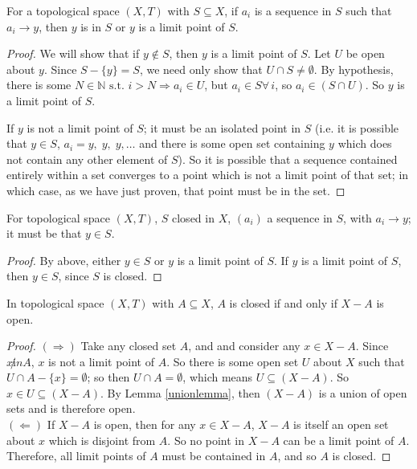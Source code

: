 \documentclass[12pt]{report}
\newcommand{\claim}{ \noindent{\sc Claim }\hspace{5pt} }
\newcommand{\corollary} {\noindent{\sc Corollary}\hspace{5pt} }
\newcommand{\fall}{\forall\,}
\newcommand{\st}{\textrm{ s.t. }}
\newcommand{\naturals}{\mathbb{N}}
\begin{document}
\claim For a topological space $(X,T)$ with $S \subseteq X$, if $a_i$
is a sequence in $S$ such that $a_i \rightarrow y$, then $y$ is in $S$
or $y$ is a limit point of $S$.

\begin{proof}
We will show that if $y \not \in S$, then $y$ is a limit point of $S$.
Let $U$ be open about $y$. Since $S - \{y\} = S$, we need only show that $U
\cap S \neq \emptyset$. By hypothesis, there is some $N \in \naturals \st 
i > N \Rightarrow a_i \in U$, but $a_i \in S \fall i$, so $a_i \in (S \cap
U)$. So $y$ is a limit point of $S$.

If $y$ is not a limit point of $S$; it must be an isolated point in $S$ (i.e.
it is possible that $y \in S$,  $a_i = y,\;y,\;y,\dots$ and there is some open
set containing $y$ which does not contain any other element of $S$). So it is
possible that a sequence contained entirely within a set converges to a point
which is not a limit point of that set; in which case, as we have just proven,
that point must be in the set.
\end{proof}

\corollary For topological space $(X,T)$, $S$ closed in $X$, $(a_i)$ a
sequence in $S$, with $a_i \rightarrow y$; it must be that $y \in S$. 

\begin{proof}
By above, either $y \in S$ or $y$ is a limit point of $S$. If $y$ is a
limit point of $S$, then $y \in S$, since $S$ is closed. 
\end{proof}

\claim In topological space $(X,T)$ with $A \subseteq X$, $A$ is closed if and
only if $X-A$ is open.

\begin{proof}
$(\Rightarrow)$ Take any closed set $A$, and and consider any $x \in X-A$.
Since $x \not in A$, $x$ is
not a limit point of $A$. So there is some open set $U$ about $X$ such that $U
\cap A - \{x\} = \emptyset$; so then $U \cap A = \emptyset$, which means $U
\subseteq (X - A)$. So $x \in U \subseteq (X - A)$. By Lemma
\ref{unionlemma}, then $(X-A)$ is a union of open sets and is therefore open. \\

$(\Leftarrow)$ If $X-A$ is open, then for any $x \in X-A$, $X-A$ is itself an
open set about $x$ which is disjoint from $A$. So no point in $X-A$ can be a
limit point of $A$. Therefore, all limit points of $A$ must be contained in
$A$, and so $A$ is closed.
\end{proof}
\end{document}
